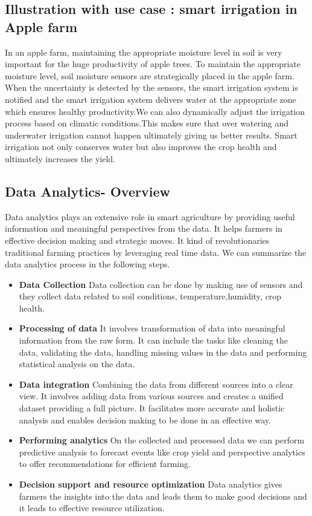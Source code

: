\documentclass{article}
\begin{document}
\subsection*{Illustration with use case : smart irrigation in Apple farm}
In an apple farm, maintaining the appropriate moisture level in soil is very important for the huge productivity of apple trees. To maintain the appropriate moisture level, soil moisture sensors are strategically placed in the apple farm. When the uncertainty is detected by the sensors, the smart irrigation system is notified and the smart irrigation system delivers water at the appropriate zone which ensures healthy productivity.We can also dynamically adjust the irrigation process based on climatic conditions.This makes sure that over watering and underwater irrigation cannot happen ultimately giving us better results. Smart irrigation not only conserves water but also improves the crop health and ultimately increases the yield.
\subsection{Data Analytics- Overview}
Data analytics plays an extensive role in smart agriculture by providing useful information and meaningful perspectives from the data. It helps farmers in effective decision making and strategic moves. It kind of revolutionaries traditional farming practices by leveraging real time data. 	We can summarize the data analytics process in the following steps.

\begin{itemize}
    \item \textbf{Data Collection} Data collection can be done by making use of sensors and they collect data related to soil conditions, temperature,humidity, crop health.


    
    \item \textbf{Processing of data
}  It involves transformation of data into meaningful information from the raw form. It can include the tasks like cleaning the data, validating the data, handling missing values in the data and performing statistical analysis on the data.
    
    \item \textbf{Data integration} Combining the data from different sources into a clear view. It involves adding data from various sources and creates a unified dataset providing a full picture. It facilitates more accurate and holistic analysis and enables decision making to be done in an effective way.

     \item \textbf{Performing analytics} On the collected and processed data we can perform predictive analysis to forecast events like crop yield and perspective analytics to offer recommendations for efficient farming.

      \item \textbf{Decision support and resource optimization} Data analytics gives farmers the insights into the data and leads them to make good decisions and it leads to effective resource utilization.
\end{itemize}
\end{document}
